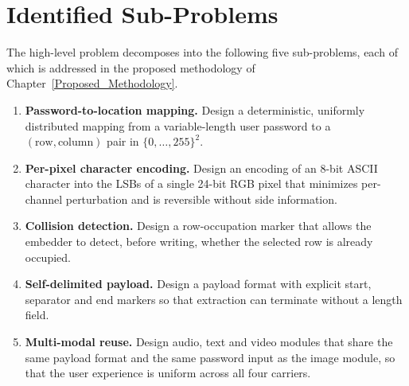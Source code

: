 \section{Identified Sub-Problems}

The high-level problem decomposes into the following five sub-problems, each of which is addressed in the proposed methodology of Chapter~\ref{Proposed_Methodology}.

\begin{enumerate}[label=\textbf{SP\arabic*.}]
    \item \textbf{Password-to-location mapping.} Design a deterministic, uniformly distributed mapping from a variable-length user password to a $(\text{row}, \text{column})$ pair in $\{0, \ldots, 255\}^2$.
    \item \textbf{Per-pixel character encoding.} Design an encoding of an 8-bit ASCII character into the LSBs of a single 24-bit RGB pixel that minimizes per-channel perturbation and is reversible without side information.
    \item \textbf{Collision detection.} Design a row-occupation marker that allows the embedder to detect, before writing, whether the selected row is already occupied.
    \item \textbf{Self-delimited payload.} Design a payload format with explicit start, separator and end markers so that extraction can terminate without a length field.
    \item \textbf{Multi-modal reuse.} Design audio, text and video modules that share the same payload format and the same password input as the image module, so that the user experience is uniform across all four carriers.
\end{enumerate}
